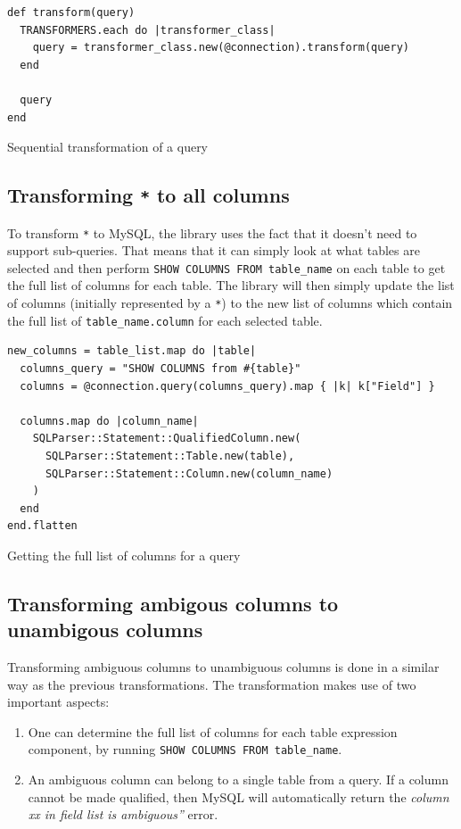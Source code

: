 \begin{listing}
\begin{verbatim}
def transform(query)
  TRANSFORMERS.each do |transformer_class|
    query = transformer_class.new(@connection).transform(query)
  end

  query
end
\end{verbatim}
\caption{Sequential transformation of a query}
\label{fig:sequential transformation of a query}
\end{listing}

\subsection{Transforming \texttt{*} to all columns}
To transform \texttt{*} to MySQL, the library uses the fact that it doesn't need to support sub-queries. That means that it can simply look at what tables are selected and then perform \texttt{SHOW COLUMNS FROM table_name} on each table to get the full list of columns for each table. The library will then simply update the list of columns (initially represented by a \texttt{*}) to the new list of columns which contain the full list of \texttt{table\_name.column} for each selected table.

\begin{listing}
\begin{verbatim}
new_columns = table_list.map do |table|
  columns_query = "SHOW COLUMNS from #{table}"
  columns = @connection.query(columns_query).map { |k| k["Field"] }

  columns.map do |column_name|
    SQLParser::Statement::QualifiedColumn.new(
      SQLParser::Statement::Table.new(table),
      SQLParser::Statement::Column.new(column_name)
    )
  end
end.flatten
\end{verbatim}
\caption{Getting the full list of columns for a query}
\end{listing}

\subsection{Transforming ambigous columns to unambigous columns}
Transforming ambiguous columns to unambiguous columns is done in a similar way as the previous transformations. The transformation makes use of two important aspects:
\begin{enumerate}
    \item One can determine the full list of columns for each table expression component, by running \texttt{SHOW COLUMNS FROM table_name}.
    \item An ambiguous column can belong to a single table from a query. If a column cannot be made qualified, then MySQL will automatically return the \textit{column xx in field list is ambiguous''} error.
\end{enumerate}

